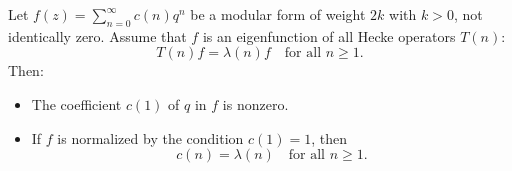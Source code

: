 Let $f(z) = \sum_{n=0}^{\infty} c(n)q^n$ be a modular form of weight $2k$ with $k > 0$, not identically zero. Assume that $f$ is an eigenfunction of all Hecke operators $T(n)$:
$$T(n)f = \lambda(n)f \quad \text{for all } n \geq 1.$$
Then:
\begin{itemize}
\item[(a)] The coefficient $c(1)$ of $q$ in $f$ is nonzero.
\item[(b)] If $f$ is normalized by the condition $c(1) = 1$, then
$$c(n) = \lambda(n) \quad \text{for all } n \geq 1.$$
\end{itemize}
